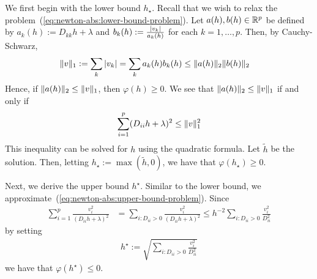 We first begin with the lower bound $h_\star$.
Recall that we wish to relax the problem~(\ref{eq:newton-abs:lower-bound-problem}).
Let $a(h), b(h) \in \mathbb{R}^p$ be defined by $a_k(h) := D_{kk} h + \lambda$
and $b_k(h) := \frac{\left|v_k\right|}{a_k(h)}$ for each $k=1,\ldots, p$.
Then, by Cauchy-Schwarz,
\begin{align*}
    \|v\|_1
    &:=
    \sum\limits_{k} \left|v_k\right|
    =
    \sum\limits_{k} a_k(h) b_k(h)
    \leq
    \|a(h)\|_{2} \|b(h)\|_2
\end{align*}
Hence, if $\|a(h)\|_2 \leq \|v\|_1$,
then $\varphi(h) \geq 0$.
We see that $\|a(h)\|_2 \leq \|v\|_1$ if and only if
\begin{align*}
    \sum\limits_{i=1}^p
    (D_{ii} h + \lambda)^2
    \leq
    \|v\|_1^2
\end{align*}
This inequality can be solved for $h$ using the quadratic formula.
Let $\tilde{h}$ be the solution.
Then, letting $h_\star := \max(\tilde{h}, 0)$,
we have that $\varphi(h_{\star}) \geq 0$.

Next, we derive the upper bound $h^\star$.
Similar to the lower bound, we approximate~(\ref{eq:newton-abs:upper-bound-problem}).
Since
\begin{align}
    \sum\limits_{i=1}^p
    \frac{v_i^2}{(D_{ii} h + \lambda)^2}
    &=
    \sum\limits_{i: D_{ii} > 0}
    \frac{v_i^2}{(D_{ii} h + \lambda)^2}
    \leq 
    h^{-2}
    \sum\limits_{i: D_{ii} > 0}
    \frac{v_i^2}{D_{ii}^2 }
    \label{eq:nmab:upper-approx}
\end{align}
by setting 
\begin{align*}
    h^\star
    := 
    \sqrt{
        \sum\limits_{i: D_{ii} > 0} \frac{v_i^2}{D_{ii}^2}
    }
\end{align*}
we have that $\varphi(h^\star) \leq 0$.